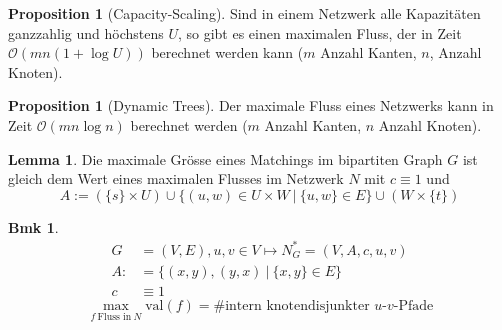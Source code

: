 \documentclass[a4paper, 10pt]{article}
\theoremstyle{definition}
\newtheorem{nlemma}[definition]{Lemma}
\newtheorem{proposition}[definition]{Proposition}
\newtheorem*{note}{Bmk}
\theoremstyle{named}
\newcommand{\BO}{\mathcal{O}}
\newcommand{\val}{\text{val}}
\begin{document}
\begin{proposition}[Capacity-Scaling]
    Sind in einem Netzwerk alle Kapazitäten ganzzahlig und höchstens $U$, so gibt es einen maximalen Fluss, der in Zeit $\BO(mn(1 + \log U))$ berechnet werden kann ($m$ Anzahl Kanten, $n$, Anzahl Knoten).
\end{proposition}

\begin{proposition}[Dynamic Trees]
    Der maximale Fluss eines Netzwerks kann in Zeit $\BO(mn \log n)$ berechnet werden ($m$ Anzahl Kanten, $n$ Anzahl Knoten).
\end{proposition}

\begin{nlemma}
    Die maximale Grösse eines Matchings im bipartiten Graph $G$ ist gleich dem Wert eines maximalen Flusses im Netzwerk $N$ mit $c \equiv 1$ und 
    $$A := (\{s\} \times U) \cup \{(u, w) \in U \times W \ | \ \{u, w\} \in E \} \cup (W \times \{t\})$$
\end{nlemma}

\begin{note}
    \begin{align*}
        G &= (V, E), u, v \in V \mapsto N_G^* = (V, A, c, u, v) \\
        A :&= \{(x, y), (y, x) \ | \ \{x, y\} \in E\} \\
        c &\equiv 1
    \end{align*}
    $$\max_{f \ \text{Fluss in} \ N} \val(f) = \text{\# intern knotendisjunkter $u$-$v$-Pfade}$$
\end{note}
\end{document}
